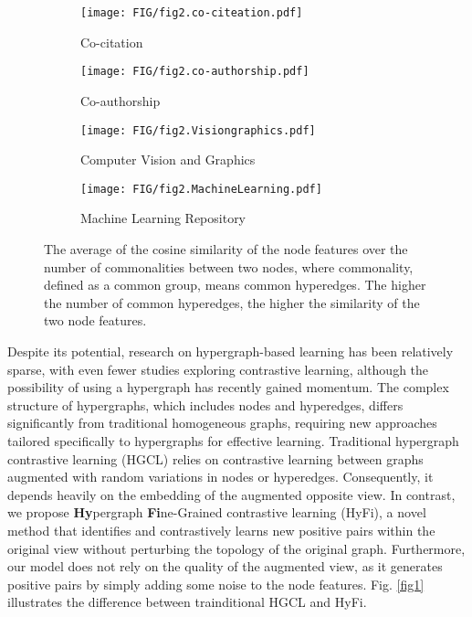 \begin{figure}[t!]
  \centering
  \begin{subfigure}[b]{0.47\columnwidth}
    \texttt{[image: FIG/fig2.co-citeation.pdf]}
    \caption{Co-citation}
  \end{subfigure}
  \hspace{5pt} %
  \begin{subfigure}[b]{0.47\columnwidth}
    \texttt{[image: FIG/fig2.co-authorship.pdf]}
    \caption{Co-authorship}
  \end{subfigure}
  \begin{subfigure}[b]{0.47\columnwidth}
    \texttt{[image: FIG/fig2.Visiongraphics.pdf]}
    \caption{Computer Vision and Graphics}
  \end{subfigure}
  \hspace{5pt} %
  \begin{subfigure}[b]{0.47\columnwidth}
    \texttt{[image: FIG/fig2.MachineLearning.pdf]}
    \caption{Machine Learning Repository}
  \end{subfigure}
  \caption{The average of the cosine similarity of the node features over the number of commonalities between two nodes, where commonality, defined as a common group, means common hyperedges. The higher the number of common hyperedges, the higher the similarity of the two node features.}
  \label{fig2}
\end{figure}

Despite its potential, research on hypergraph-based learning has been relatively sparse, with even fewer studies exploring contrastive learning, although the possibility of using a hypergraph has recently gained momentum. The complex structure of hypergraphs, which includes nodes and hyperedges, differs significantly from traditional homogeneous graphs, requiring new approaches tailored specifically to hypergraphs for effective learning. Traditional hypergraph contrastive learning (HGCL) relies on contrastive learning between graphs augmented with random variations in nodes or hyperedges. Consequently, it depends heavily on the embedding of the augmented opposite view. In contrast, we propose \textbf{Hy}pergraph \textbf{Fi}ne-Grained contrastive learning (HyFi), a novel method that identifies and contrastively learns new positive pairs within the original view without perturbing the topology of the original graph. Furthermore, our model does not rely on the quality of the augmented view, as it generates positive pairs by simply adding some noise to the node features. Fig. \ref{fig1} illustrates the difference between trainditional HGCL and HyFi.

